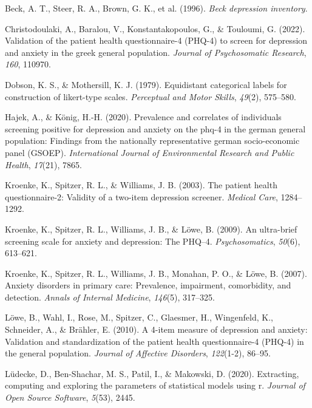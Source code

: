 \documentclass[
  jou,
  floatsintext,
  longtable,
  nolmodern,
  notxfonts,
  notimes,
  colorlinks=true,linkcolor=blue,citecolor=blue,urlcolor=blue]{apa7}
\newlength{\cslhangindent}
\newenvironment{CSLReferences}[2] %
 {\begin{list}{}{%
  \setlength{\itemindent}{0pt}
  \setlength{\leftmargin}{0pt}
  \setlength{\parsep}{0pt}
  \ifodd #1
   \setlength{\leftmargin}{\cslhangindent}
   \setlength{\itemindent}{-1\cslhangindent}
  \fi
  \setlength{\itemsep}{#2\baselineskip}}}
 {\end{list}}
\begin{document}
\label{refs}
\begin{CSLReferences}{1}{0}
Beck, A. T., Steer, R. A., Brown, G. K., et al. (1996). \emph{Beck
depression inventory}.

Christodoulaki, A., Baralou, V., Konstantakopoulos, G., \& Touloumi, G.
(2022). Validation of the patient health questionnaire-4 (PHQ-4) to
screen for depression and anxiety in the greek general population.
\emph{Journal of Psychosomatic Research}, \emph{160}, 110970.

Dobson, K. S., \& Mothersill, K. J. (1979). Equidistant categorical
labels for construction of likert-type scales. \emph{Perceptual and
Motor Skills}, \emph{49}(2), 575--580.

Hajek, A., \& König, H.-H. (2020). Prevalence and correlates of
individuals screening positive for depression and anxiety on the phq-4
in the german general population: Findings from the nationally
representative german socio-economic panel (GSOEP). \emph{International
Journal of Environmental Research and Public Health}, \emph{17}(21),
7865.

Kroenke, K., Spitzer, R. L., \& Williams, J. B. (2003). The patient
health questionnaire-2: Validity of a two-item depression screener.
\emph{Medical Care}, 1284--1292.

Kroenke, K., Spitzer, R. L., Williams, J. B., \& Löwe, B. (2009). An
ultra-brief screening scale for anxiety and depression: The PHQ--4.
\emph{Psychosomatics}, \emph{50}(6), 613--621.

Kroenke, K., Spitzer, R. L., Williams, J. B., Monahan, P. O., \& Löwe,
B. (2007). Anxiety disorders in primary care: Prevalence, impairment,
comorbidity, and detection. \emph{Annals of Internal Medicine},
\emph{146}(5), 317--325.

Löwe, B., Wahl, I., Rose, M., Spitzer, C., Glaesmer, H., Wingenfeld, K.,
Schneider, A., \& Brähler, E. (2010). A 4-item measure of depression and
anxiety: Validation and standardization of the patient health
questionnaire-4 (PHQ-4) in the general population. \emph{Journal of
Affective Disorders}, \emph{122}(1-2), 86--95.

Lüdecke, D., Ben-Shachar, M. S., Patil, I., \& Makowski, D. (2020).
Extracting, computing and exploring the parameters of statistical models
using r. \emph{Journal of Open Source Software}, \emph{5}(53), 2445.


\end{CSLReferences}
\end{document}
